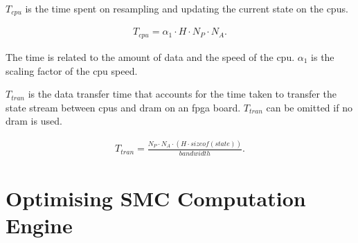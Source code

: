 $T_{cpu}$ is the time spent on resampling and updating the current state on the \glspl{cpu}.

\begin{equation}
\begin{aligned}
T_{cpu} = \alpha_1 \cdot H \cdot N_P \cdot N_A \mbox{.}
\end{aligned}
\end{equation}

The time is related to the amount of data and the speed of the \gls{cpu}.
$\alpha_1$ is the scaling factor of the \gls{cpu} speed.

$T_{tran}$ is the data transfer time that accounts for the time taken to transfer the state stream between \glspl{cpu} and \gls{dram} on an \gls{fpga} board.
$T_{tran}$ can be omitted if no \gls{dram} is used.

\begin{equation}
\begin{aligned}
T_{tran} = \frac{N_P \cdot N_A \cdot \left ( H \cdot sizeof(state)\right)}{bandwidth} \mbox{.}
\end{aligned}
\end{equation}




\section{Optimising SMC Computation Engine}
\label{sec:flow_optimisation}

